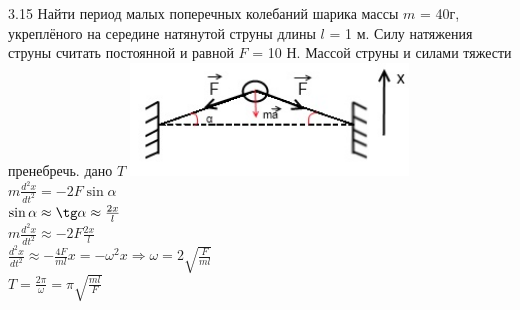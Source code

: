 \testCom
{%
	3.15
}
{%
	Найти период малых поперечных колебаний шарика массы $m$ = 40г, укреплёного на середине натянутой струны длины $l$ = 1 м. Силу натяжения струны считать постоянной и равной $F$ = 10 Н. Массой струны и силами тяжести пренебречь.
}
{%
	дано
}
{%
	$T$
}
{%
	\includegraphics[height=30mm]{3_15.jpg}\\
	$m \frac{d^2x}{dt^2} = - 2 F \sin \alpha$\\
	$\sin \alpha \approx \tg \alpha \approx \frac{2x}{l}$\\
	$m\frac{d^2x}{dt^2} \approx - 2 F \frac{2x}{l}$\\
	$\frac{d^2x}{dt^2} \approx - \frac{4 F}{m l}x = - \omega^2 x\Rightarrow \omega = 2 \sqrt{\frac{F}{ml}}$\\
	$T = \frac{2\pi}{\omega}=\pi \sqrt{\frac{ml}{F}}$\\
}


